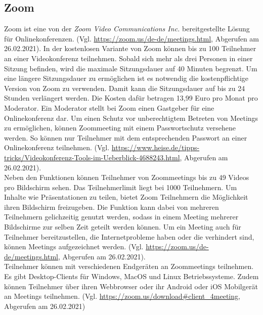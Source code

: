 \subsection{Zoom}
Zoom ist eine von der \textit{Zoom Video Communications Inc.} bereitgestellte Lösung für Onlinekonferenzen.
(Vgl. \url{https://zoom.us/de-de/meetings.html}, Abgerufen am 26.02.2021).
In der kostenlosen Variante von Zoom können bis zu 100 Teilnehmer an einer Videokonferenz teilnehmen.
Sobald sich mehr als drei Personen in einer Sitzung befinden, wird die maximale Sitzungsdauer auf 40 Minuten begrenzt.
Um eine längere Sitzungsdauer zu ermöglichen ist es notwendig die kostenpflichtige Version von Zoom zu verwenden.
Damit kann die Sitzungsdauer auf bis zu 24 Stunden verlängert werden. Die Kosten dafür betragen 13,99 Euro pro Monat pro Moderator.
Ein Moderator stellt bei Zoom einen Gastgeber für eine Onlinekonferenz dar.
Um einen Schutz vor unberechtigtem Betreten von Meetings zu ermöglichen, können Zoommeeting mit einem Passwortschutz versehene werden.
So können nur Teilnehmer mit dem entsprechenden Passwort an einer Onlinekonferenz teilnehmen.
(Vgl. \url{https://www.heise.de/tipps-tricks/Videokonferenz-Tools-im-Ueberblick-4688243.html}, Abgerufen am 26.02.2021).
\\
Neben den Funktionen können Teilnehmer von Zoommeetings bis zu 49 Videos pro Bildschirm sehen.
Das Teilnehmerlimit liegt bei 1000 Teilnehmern. Um Inhalte wie Präsentationen zu teilen, bietet Zoom Teilnehmern die Möglichkeit ihren Bildschirm freizugeben.
Die Funktion kann dabei von mehreren Teilnehmern gelichzeitig genutzt werden, sodass in einem Meeting mehrerer Bildschirme zur selben Zeit geteilt werden können.
Um ein Meeting auch für Teilnehmer bereitzustellen, die Internetprobleme haben oder die verhindert sind, können Meetings aufgezeichnet werden.
(Vgl. \url{https://zoom.us/de-de/meetings.html}, Abgerufen am 26.02.2021).
\\
Teilnehmer können mit verschiedenen Endgeräten an Zoommeetings teilnehmen.
Es gibt Desktop-Clients für Windows, MacOS und Linux Betriebssysteme.
Zudem können Teilnehmer über ihren Webbrowser oder ihr Android oder iOS Mobilgerät an Meetings teilnehmen.
(Vgl. \url{https://zoom.us/download#client_4meeting}, Abgerufen am 26.02.2021)
\\

